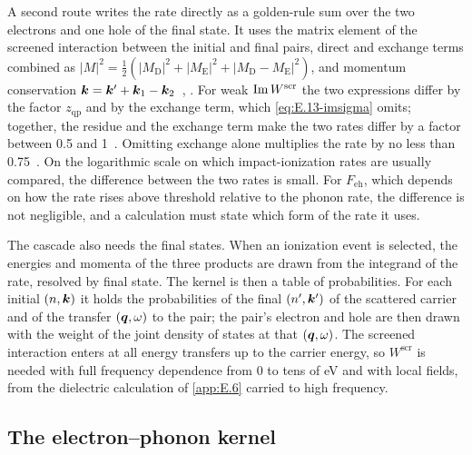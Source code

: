 A second route writes the rate directly as a golden-rule sum over the two electrons and one hole of the final state. It uses the matrix element of the screened interaction between the initial and final pairs, direct and exchange terms combined as $|M|^2 = \tfrac12(|M_{\mathrm{D}}|^2 + |M_{\mathrm{E}}|^2 + |M_{\mathrm{D}} - M_{\mathrm{E}}|^2)$, and momentum conservation $\bm{k} = \bm{k}' + \bm{k}_1 - \bm{k}_2$~\cite{kane1967electron}, \cite[Eq.~(5)]{kotani2010impact}. For weak $\operatorname{Im} W^{\mathrm{scr}}$ the two expressions differ by the factor $z_{\mathrm{qp}}$ and by the exchange term, which \cref{eq:E.13-imsigma} omits; together, the residue and the exchange term make the two rates differ by a factor between 0.5 and 1~\cite[Sect.~II]{kotani2010impact}. Omitting exchange alone multiplies the rate by no less than 0.75~\cite[Sect.~II]{kotani2010impact}. On the logarithmic scale on which impact-ionization rates are usually compared, the difference between the two rates is small. For $F_{\mathrm{eh}}$, which depends on how the rate rises above threshold relative to the phonon rate, the difference is not negligible, and a calculation must state which form of the rate it uses.

The cascade also needs the final states. When an ionization event is selected, the energies and momenta of the three products are drawn from the integrand of the rate, resolved by final state. The kernel is then a table of probabilities. For each initial $(n, \bm{k})$ it holds the probabilities of the final $(n', \bm{k}')$ of the scattered carrier and of the transfer $(\bm{q}, \omega)$ to the pair; the pair's electron and hole are then drawn with the weight of the joint density of states at that $(\bm{q}, \omega)$. The screened interaction enters at all energy transfers up to the carrier energy, so $W^{\mathrm{scr}}$ is needed with full frequency dependence from 0 to tens of eV and with local fields, from the dielectric calculation of \cref{app:E.6} carried to high frequency.

\subsection{The electron--phonon kernel}

